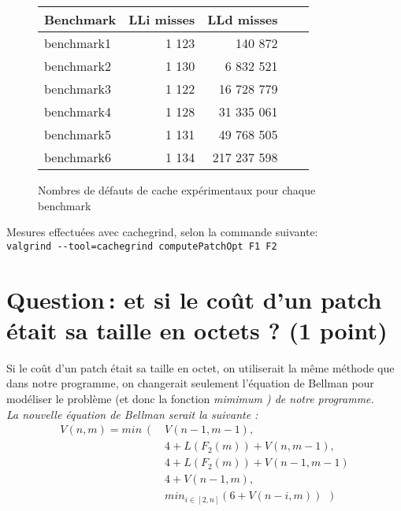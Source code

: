 \documentclass[a4paper, 10pt, french]{article}
\begin{document}
              \begin{figure}[h]
      \begin{center}
        \begin{tabular}{|l||r||r|r|r||}
          \hline
          \hline
            Benchmark & LLi misses & LLd misses \\
          \hline
          \hline
            benchmark1 &  1 123 & 140 872    \\
          \hline
            benchmark2 &  1 130   & 6 832 521 \\
          \hline
            benchmark3 &  1 122  & 16 728 779\\
          \hline
            benchmark4 &  1 128    & 31 335 061\\
          \hline
            benchmark5 &   1 131   & 49 768 505\\
          \hline
            benchmark6 &    1 134 & 217 237 598\\
          \hline
          \hline
        \end{tabular}
        \caption{Nombres de défauts de cache expérimentaux pour chaque benchmark}
        \label{table-temps}
      \end{center}
    \end{figure}
  
   
    Mesures effectuées avec cachegrind, selon la commande suivante:\\
    \verb+valgrind --tool=cachegrind computePatchOpt F1 F2+ 
 

\section{Question\,: et  si le coût d'un patch était sa taille en octets ? (1 point)}
Si le coût d'un patch était sa taille en octet, on utiliserait la même méthode que dans notre programme, on changerait seulement l'équation de Bellman pour modéliser le problème (et donc la fonction \it mimimum \rm ) de notre programme. \\

La nouvelle équation de Bellman serait la suivante : 
\begin{align*}
V(n,m)= min ~~(~~  &  V(n-1,m-1), \\
& 4 + L(F_2(m))+V(n,m-1),\\
&  4+L(F_2(m))+V(n-1,m-1)\\
& 4 + V(n-1, m),\\
& min_{i\in [2,n]} (6+ V(n-i,m)) ~~~)
\end{align*}
\end{document}
